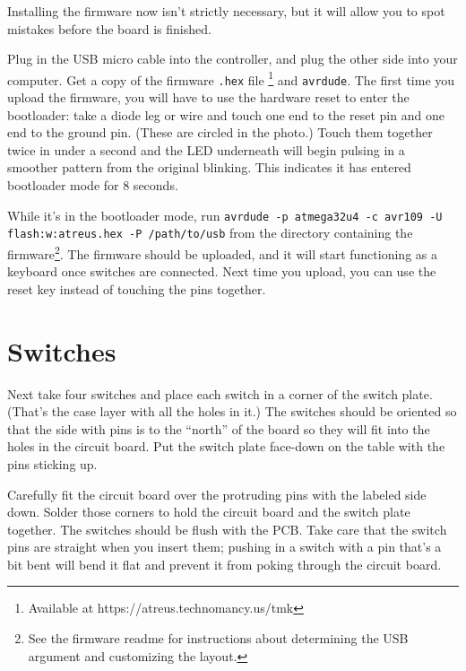 \documentclass[landscape,twocolumn]{article}
\begin{document}
Installing the firmware now isn't strictly necessary, but it will
allow you to spot mistakes before the board is finished.

\vspace{1em}

Plug in the USB micro cable into the controller, and plug the other
side into your computer. Get a copy of the
firmware \texttt{.hex} file \footnote{Available at
  https://atreus.technomancy.us/tmk} and \texttt{avrdude}. The
first time you upload the firmware, you will have to use the hardware
reset to enter the bootloader: take a diode leg or wire and touch one
end to the reset pin and one end to the ground pin. (These are circled
in the photo.)  Touch them together twice in under a second and the
LED underneath will begin pulsing in a smoother pattern from the
original blinking. This indicates it has entered bootloader mode for 8
seconds.

\vspace{1em}

While it's in the bootloader mode, run \texttt{avrdude -p atmega32u4
  -c avr109 -U flash:w:atreus.hex -P /path/to/usb} from the directory
containing the firmware\footnote{See the firmware readme for
  instructions about determining the USB argument and customizing the
  layout.}. The firmware should be uploaded, and it will start
functioning as a keyboard once switches are connected. Next time you
upload, you can use the reset key instead of touching the pins
together.

\section{Switches}

Next take four switches and place each switch in a corner of the
switch plate. (That's the case layer with all the holes in it.) The
switches should be oriented so that the side with pins is to the
``north'' of the board so they will fit into the holes in the circuit
board. Put the switch plate face-down on the table with the pins
sticking up.

\vspace{1em}

Carefully fit the circuit board over the protruding pins with the
labeled side down. Solder those corners to hold the circuit board and
the switch plate together. The switches should be flush with the
PCB. Take care that the switch pins are straight when you insert them;
pushing in a switch with a pin that's a bit bent will bend it flat and
prevent it from poking through the circuit board.
\end{document}
